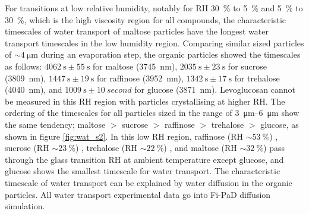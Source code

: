 For transitions at low relative humidity, notably for RH \SI{30}{\percent} to \SI{5}{\percent} and \SI{5}{\percent} to \SI{30}{\percent}, which is the high viscosity region for all compounds, the characteristic timescales of water transport of maltose particles have the longest water transport timescales in the low humidity region. Comparing similar sized particles of $\sim \SI{4}{\micro\meter}$ during an evaporation step, the organic particles showed the timescales as follows: $\SI{4062}{\second} \pm \SI{55}{\second}$ for maltose (\SI{3745}{\nano\meter}), $\SI{2035}{\second} \pm \SI{23}{\second}$ for sucrose (\SI{3809}{\nano\meter}), $\SI{1447}{\second} \pm \SI{19}{\second}$ for raffinose (\SI{3952}{\nano\meter}), $\SI{1342}{\second} \pm \SI{17}{\second}$ for trehalose (\SI{4040}{\nano\meter}), and $\SI{1009}{\second} \pm \SI{10}{second}$ for glucose (\SI{3871}{\nano\meter}). Levoglucosan cannot be measured in this RH region with particles crystallising at higher RH. The ordering of the timescales for all particles sized in the range of \SIrange[range-phrase=\text{--}]{3}{6}{\micro\meter} show the same tendency; maltose $>$ sucrose $>$ raffinose $>$ trehalose $>$ glucose, as shown in figure \ref{fig:wat_s2}. In this low RH region, raffinose (RH $\sim \SI{53}{\percent}$) \cite{Song2016a,Tong2011}, sucrose (RH $\sim \SI{23}{\percent}$) \cite{Song2016a,Tong2011}, trehalose (RH $\sim \SI{22}{\percent}$) \cite{Song2016a,chenLiteratureReviewSupplemented2000}, and maltose (RH $\sim \SI{32}{\percent}$) \cite{Song2016a,fosterGlassTransitionRelated2006} pass through the glass transition RH at ambient temperature except glucose, and glucose shows the smallest timescale for water transport. The characteristic timescale of water transport can be explained by water diffusion in the organic particles. All water transport experimental data go into Fi-PaD diffusion simulation.


